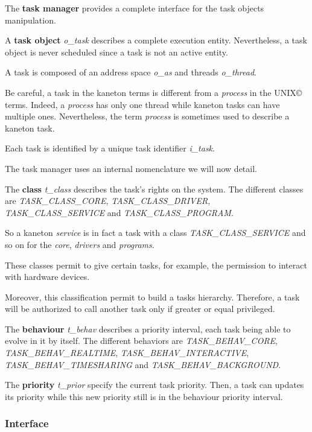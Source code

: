 The \textbf{task manager} provides a complete interface for the task
objects manipulation.

A \textbf{task object} \textit{o\_task} describes a complete execution
entity. Nevertheless, a task object is never scheduled since a task
is not an active entity.

A task is composed of an address space \textit{o\_as} and threads
\textit{o\_thread}.

Be careful, a task in the kaneton terms is different from a \textit{process}
in the UNIX{\copyright} terms. Indeed, a \textit{process} has only one
thread while kaneton tasks can have multiple ones. Nevertheless, the
term \textit{process} is sometimes used to describe a kaneton task.

Each task is identified by a unique task identifier \textit{i\_task}.

The task manager uses an internal nomenclature we will now detail.

The \textbf{class} \textit{t\_class} describes the task's rights on the
system. The different classes are \textit{TASK\_CLASS\_CORE},
\textit{TASK\_CLASS\_DRIVER}, \textit{TASK\_CLASS\_SERVICE} and
\textit{TASK\_CLASS\_PROGRAM}.

So a kaneton \textit{service} is in fact a task with a class
\textit{TASK\_CLASS\_SERVICE} and so on for the \textit{core},
\textit{drivers} and \textit{programs}.

These classes permit to give certain tasks, for example, the permission
to interact with hardware devices.

Moreover, this classification permit to build a tasks hierarchy.
Therefore, a task will be authorized to call another task only if
greater or equal privileged.


The \textbf{behaviour} \textit{t\_behav} describes a priority
interval, each task being able to evolve in it by itself. The different
behaviors are \textit{TASK\_BEHAV\_CORE}, \textit{TASK\_BEHAV\_REALTIME},
\textit{TASK\_BEHAV\_INTERACTIVE}, \textit{TASK\_BEHAV\_TIMESHARING}
and \textit{TASK\_BEHAV\_BACKGROUND}.

The \textbf{priority} \textit{t\_prior} specify the current task
priority. Then, a task can updates its priority while this new priority
still is in the behaviour priority interval.

%
%

\subsubsection{Interface}


